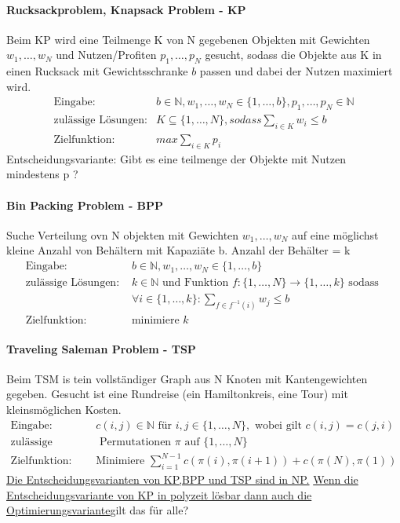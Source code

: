 \documentclass[a4paper, 10pt]{article}
\theoremstyle{definition}
\begin{document}
\paragraph{Rucksackproblem, Knapsack Problem - KP}
Beim KP wird eine Teilmenge K von N gegebenen Objekten mit Gewichten $w_1,\dots,w_N$ und Nutzen/Profiten $p_1,\dots,p_N$ gesucht, sodass die Objekte aus K in einen Rucksack mit Gewichtsschranke $b$ passen und dabei der Nutzen maximiert wird.
\begin{align*}
    \text{Eingabe: }&b\in\mathbb{N},w_1,\dots,w_N\in\{1,\dots,b\},p_1,\dots,p_N\in\mathbb{N}\\
    \text{zulässige Lösungen:}&K\subseteq\{1,\dots,N\},so dass \sum_{i\in K}w_i\leq b\\
    \text{Zielfunktion: }& max \sum_{i\in K}p_i
\end{align*}
Entscheidungsvariante: Gibt es eine teilmenge der Objekte mit Nutzen mindestens p ?
\paragraph{Bin Packing Problem - BPP}
Suche Verteilung ovn N objekten mit Gewichten $w_1,\dots,w_N$ auf eine möglichst kleine Anzahl von Behältern mit Kapaziäte b. Anzahl der Behälter = k\begin{align*}
    \text{Eingabe: }&b\in\mathbb{N},w_1,\dots,w_N\in\{1,\dots,b\}\\
    \text{zulässige Lösungen: }&k\in\mathbb{N}\text{ und Funktion }f:\{1,\dots,N\}\to\{1,\dots,k\}\text{ sodass }\\
    &\forall i\in\{1,\dots,k\}:\sum_{f\in f^{-1}(i)}w_j\leq b\\
    \text{Zielfunktion: }& \text{minimiere } k 
\end{align*}
\paragraph{Traveling Saleman Problem - TSP}
Beim TSM is tein vollständiger Graph aus N Knoten mit Kantengewichten gegeben. Gesucht ist eine Rundreise (ein Hamiltonkreis, eine Tour) mit kleinsmöglichen Kosten.
\begin{align*}
    \text{Eingabe: }&c(i,j)\in\mathbb{N} \text{ für }i,j\in\{1,\dots,N\},\text{ wobei gilt }c(i,j)=c(j,i)\\
    \text{zulässige Lösungen: }&\text{ Permutationen $\pi$ auf }\{1,\dots,N\}\\
    \text{Zielfunktion: }&\text{Minimiere }\sum_{i=1}^{N-1}c(\pi(i),\pi(i+1))+c(\pi(N),\pi(1)) 
\end{align*}
\underline{Die Entscheidungsvarianten von KP,BPP und TSP sind in NP.}
\underline{Wenn die Entscheidungsvariante von KP in polyzeit lösbar dann auch die Optimierungsvariante}gilt das für alle?
\end{document}
